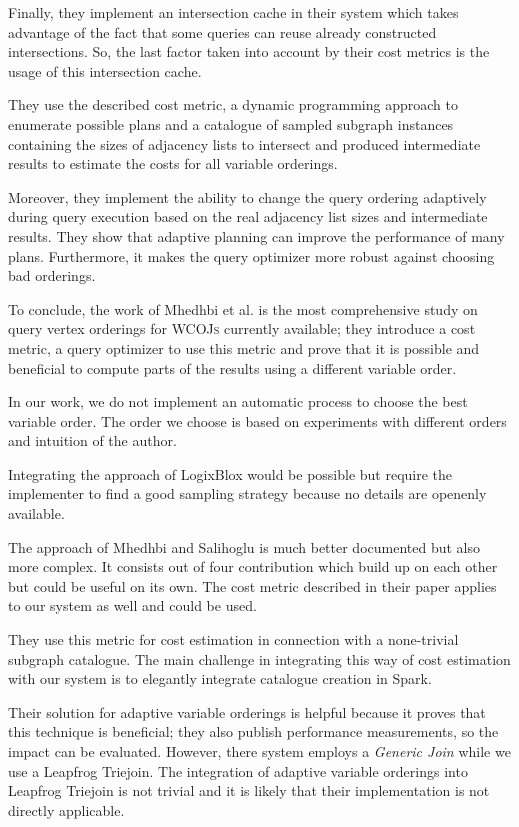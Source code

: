 Finally, they implement an intersection cache in their system which takes advantage of the fact that some queries can reuse already
constructed intersections.
So, the last factor taken into account by their cost metrics is the usage of this intersection cache.

They use the described cost metric, a dynamic programming approach to enumerate possible plans and  a catalogue of sampled subgraph
instances containing the sizes of adjacency lists to intersect and produced intermediate results to estimate the costs for all
variable orderings.

Moreover, they implement the ability to change the query ordering adaptively during query execution  based on the real adjacency list sizes
and intermediate results.
They show that adaptive planning can improve the performance of many plans.
Furthermore, it makes the query optimizer more robust against choosing bad orderings.

To conclude, the work of Mhedhbi et al. is the most comprehensive study on query vertex orderings for \textsc{WCOJs} currently available;
they introduce a cost metric, a query optimizer to use this metric and prove that it is possible and beneficial to compute parts of
the results using a different variable order.

In our work, we do not implement an automatic process to choose the best variable order.
The order we choose is based on experiments with different orders and intuition of the author.

Integrating the approach of LogixBlox would be possible but require the implementer to find a good sampling strategy because no details
are openenly available.

The approach of Mhedhbi and Salihoglu is much better documented but also more complex.
It consists out of four contribution which build up on each other but could be useful on its own.
The cost metric described in their paper applies to our system as well and could be used.

They use this metric for cost estimation in connection with a none-trivial subgraph catalogue.
The main challenge in integrating this way of cost estimation with our system is to elegantly integrate catalogue creation in Spark.

Their solution for adaptive variable orderings is helpful because it proves that this technique is beneficial;
they also publish performance measurements, so the impact can be evaluated.
However, there system employs a \textit{Generic Join} while we use a Leapfrog Triejoin.
The integration of adaptive variable orderings into Leapfrog Triejoin is not trivial and it is likely that their implementation is not
directly applicable.


